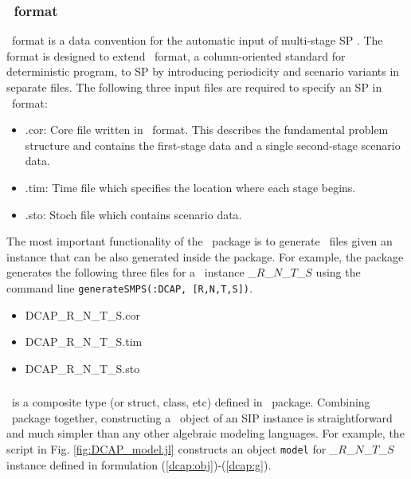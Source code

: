 \subsubsection{\smps\ format} \label{subsec:smps}
\smps\ format is a data convention for the automatic input of multi-stage SP \cite{SMPS}. The format is designed to extend \mps\ format, a column-oriented standard for deterministic program, to SP by introducing periodicity and scenario variants in separate files. The following three input files are required to specify an SP in \smps\ format:
\begin{itemize}
	\item .cor: Core file written in \mps\ format. This describes the fundamental problem structure and contains the first-stage data and a single second-stage scenario data.
	\item .tim: Time file which specifies the location where each stage begins.
	\item .sto: Stoch file which contains scenario data.
\end{itemize}
The most important functionality of the \siplibtwo\ package is to generate \smps\ files given an instance that can be also generated inside the package. For example, the package generates the following three files for a \dcap\ instance \dcap\_$R$\_$N$\_$T$\_$S$ using the command line \texttt{generateSMPS(:DCAP, [R,N,T,S])}.
\begin{itemize}
	\item DCAP\_R\_N\_T\_S.cor
	\item DCAP\_R\_N\_T\_S.tim
	\item DCAP\_R\_N\_T\_S.sto
\end{itemize}

\subsubsection{\jumpmodel}
\jumpmodel\ is a composite type (or struct, class, etc) defined in \jump\ package. Combining \structjump\ package together, constructing a \jumpmodel\ object of an SIP instance is straightforward and much simpler than any other algebraic modeling languages. For example, the script in Fig. \ref{fig:DCAP_model.jl} constructs an object \texttt{model} for \dcap\_$R$\_$N$\_$T$\_$S$ instance defined in formulation (\ref{dcap:obj})-(\ref{dcap:g}). 

